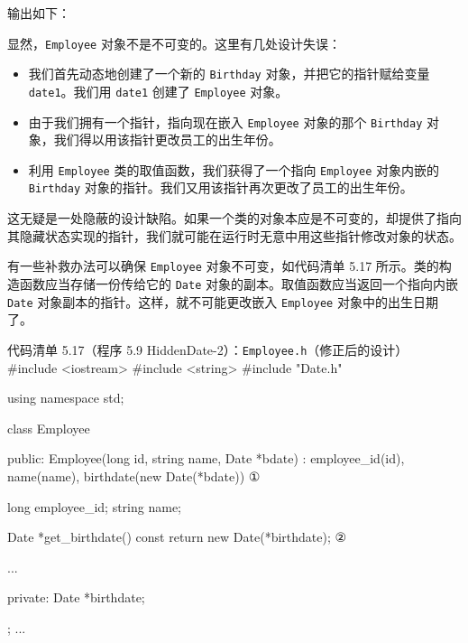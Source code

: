 输出如下：


显然，\texttt{Employee} 对象不是不可变的。这里有几处设计失误：

\begin{itemize}
\item 我们首先动态地创建了一个新的 \texttt{Birthday} 对象，并把它的指针赋给变量 \texttt{date1}。我们用 \texttt{date1} 创建了 \texttt{Employee} 对象。
\item 由于我们拥有一个指针，指向现在嵌入 \texttt{Employee} 对象的那个 \texttt{Birthday} 对象，我们得以用该指针更改员工的出生年份。
\item 利用 \texttt{Employee} 类的取值函数，我们获得了一个指向 \texttt{Employee} 对象内嵌的 \texttt{Birthday} 对象的指针。我们又用该指针再次更改了员工的出生年份。
\end{itemize}


这无疑是一处隐蔽的设计缺陷。如果一个类的对象本应是不可变的，却提供了指向其隐藏状态实现的指针，我们就可能在运行时无意中用这些指针修改对象的状态。

有一些补救办法可以确保 \texttt{Employee} 对象不可变，如代码清单 5.17 所示。类的构造函数应当存储一份传给它的 \texttt{Date} 对象的副本。取值函数应当返回一个指向内嵌 \texttt{Date} 对象副本的指针。这样，就不可能更改嵌入 \texttt{Employee} 对象中的出生日期了。

\begin{codeboxt}{代码清单 5.17（程序 5.9 HiddenDate-2）：\texttt{Employee.\allowbreak{}h}（修正后的设计）}
#include <iostream>
#include <string>
#include "Date.h"

using namespace std;

class Employee
{
public:
    Employee(long id, string name, Date *bdate)
        : employee_id(id), name(name),
          birthdate(new Date(*bdate)) {}                           ①

    long employee_id;
    string name;

    Date *get_birthdate() const { return new Date(*birthdate); }   ②

    ...

private:
    Date *birthdate;
};
...
\end{codeboxt}
\par
{}\par

